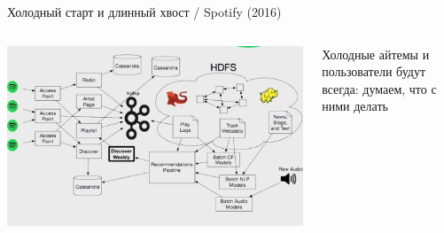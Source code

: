 \documentclass[11pt,aspectratio=169]{beamer}
\begin{document}
\begin{frame}{Холодный старт и длинный хвост / Spotify (2016) \cite{SPTF}}
\begin{columns}
\begin{column}{0.6\textwidth}
   \begin{center}
		\includegraphics[scale=0.31]{images/spotify.jpeg}
   \end{center}
\end{column}
\begin{column}{0.3\textwidth}
    \begin{tcolorbox}[colback=info!5,colframe=info!80,title=]
    Холодные айтемы и пользователи будут всегда: думаем, что с ними делать
    \end{tcolorbox}
\end{column}
\end{columns}

\end{frame}
\end{document}
